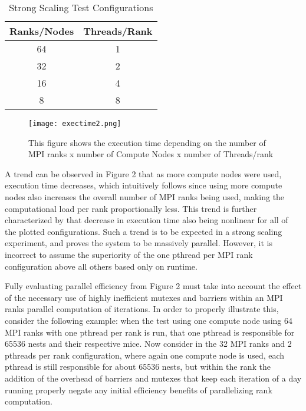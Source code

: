 \documentclass[letterpaper, 10 pt, conference]{ieeeconf}  %
\begin{document}
\begin{table}[!htbp]
\centering
 \begin{tabular}{||c | c||} 
 \hline
 Ranks/Nodes & Threads/Rank \\ 
 \hline\hline
 64 & 1 \\ 
 \hline
 32 & 2 \\
 \hline
 16 & 4 \\
 \hline
 8 & 8 \\ 
 \hline
\end{tabular}
\caption{Strong Scaling Test Configurations}
\end{table}

\begin{figure}[!htbp]
  \texttt{[image: exectime2.png]}
  \caption{This figure shows the execution time depending on the number of MPI ranks x number of Compute Nodes x number of Threads/rank}
\end{figure}

A trend can be observed in Figure 2 that as more compute nodes were used, execution time decreases, which intuitively follows since using more compute nodes also increases the overall number of MPI ranks being used, making the computational load per rank proportionally less.  This trend is further characterized by that decrease in execution time also being nonlinear for all of the plotted configurations.  Such a trend is to be expected in a strong scaling experiment, and proves the system to be massively parallel.  However, it is incorrect to assume the superiority of the one pthread per MPI rank configuration above all others based only on runtime. 

Fully evaluating parallel efficiency from Figure 2 must take into account the effect of the necessary use of highly inefficient mutexes and barriers within an MPI ranks parallel computation of iterations.  In order to properly illustrate this, consider the following example: when the test using one compute node using 64 MPI ranks with one pthread per rank is run, that one pthread is responsible for 65536 nests and their respective mice.  Now consider in the 32 MPI ranks and 2 pthreads per rank configuration, where again one compute node is used, each pthread is still responsible for about 65536 nests, but within the rank the addition of the overhead of barriers and mutexes that keep each iteration of a day running properly negate any initial efficiency benefits of parallelizing rank computation. 
\end{document}
